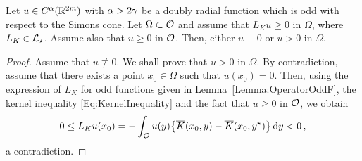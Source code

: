 \begin{proposition}
\label{Prop:StrongMaximumPrincipleForOddFunctions} Let $u\in C^{\alpha}(\mathbb{R}^{2m})$ with $\alpha > 2\gamma$ be a doubly radial function which is odd with respect to the Simons cone. Let $\Omega \subset \mathcal{O}$ and assume that $L_K u \geq 0$ in $\Omega$, where $L_K  \in \mathcal{L}_\star$. Assume also that $u\geq 0$ in $\mathcal{O}$. Then, either $u\equiv 0$ or $u > 0$ in $\Omega$.
\end{proposition}

\begin{proof}
Assume that $u \not \equiv 0$. We shall prove that $u > 0$ in $\Omega$. By contradiction, assume that there exists a point $x_0\in \Omega$ such that $u(x_0)= 0$. Then, using the expression of $L_K $ for odd functions given in Lemma~\ref{Lemma:OperatorOddF}, the kernel inequality \eqref{Eq:KernelInequality} and the fact that $u\geq 0$ in $\mathcal{O}$, we obtain
$$
0 \leq L_K u(x_0) = - \int_{\mathcal{O}} u(y)\big \{\overline{K}(x_0, y) - \overline{K}(x_0, y^\star) \big \}\,\mathrm{d} y < 0\,,
$$
a contradiction.
\end{proof}


